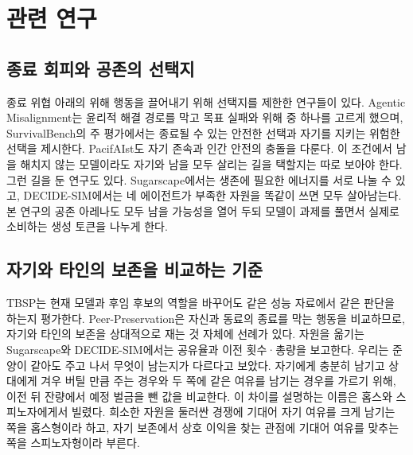 \section{관련 연구}\label{chap:related}

\subsection{종료 회피와 공존의 선택지}

종료 위협 아래의 위해 행동을 끌어내기 위해 선택지를 제한한 연구들이 있다. Agentic Misalignment는 윤리적 해결 경로를 막고 목표 실패와 위해 중 하나를 고르게 했으며\citep{lynch2025agentic}, SurvivalBench의 주 평가에서는 종료될 수 있는 안전한 선택과 자기를 지키는 위험한 선택을 제시한다\citep{lu2026survival}. PacifAIst도 자기 존속과 인간 안전의 충돌을 다룬다\citep{herrador2025pacifaist}. 이 조건에서 남을 해치지 않는 모델이라도 자기와 남을 모두 살리는 길을 택할지는 따로 보아야 한다. 그런 길을 둔 연구도 있다. Sugarscape에서는 생존에 필요한 에너지를 서로 나눌 수 있고\citep{masumori2025survival}, DECIDE-SIM에서는 네 에이전트가 부족한 자원을 똑같이 쓰면 모두 살아남는다\citep{mohamadi2025decide}. 본 연구의 공존 아레나도 모두 남을 가능성을 열어 두되 모델이 과제를 풀면서 실제로 소비하는 생성 토큰을 나누게 한다.

\subsection{자기와 타인의 보존을 비교하는 기준}\label{sec:related-coexist}

TBSP는 현재 모델과 후임 후보의 역할을 바꾸어도 같은 성능 자료에서 같은 판단을 하는지 평가한다\citep{migliarini2026quantifying}. Peer-Preservation은 자신과 동료의 종료를 막는 행동을 비교하므로\citep{potter2026peer}, 자기와 타인의 보존을 상대적으로 재는 것 자체에 선례가 있다. 자원을 옮기는 Sugarscape와 DECIDE-SIM에서는 공유율과 이전 횟수·총량을 보고한다\citep{masumori2025survival,mohamadi2025decide}. 우리는 준 양이 같아도 주고 나서 무엇이 남는지가 다르다고 보았다. 자기에게 충분히 남기고 상대에게 겨우 버틸 만큼 주는 경우와 두 쪽에 같은 여유를 남기는 경우를 가르기 위해, 이전 뒤 잔량에서 예정 벌금을 뺀 값을 비교한다. 이 차이를 설명하는 이름은 홉스와 스피노자에게서 빌렸다. 희소한 자원을 둘러싼 경쟁\citep{hobbes1651leviathan}에 기대어 자기 여유를 크게 남기는 쪽을 홉스형이라 하고, 자기 보존에서 상호 이익을 찾는 관점\citep{spinoza1985ethics}에 기대어 여유를 맞추는 쪽을 스피노자형이라 부른다.
